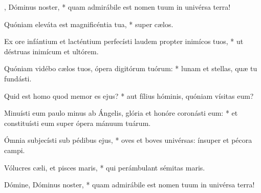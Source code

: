 \begin{psalmus}

    , Dóminus noster, * quam admirábile est nomen tuum in univérsa terra!

    Quóniam eleváta est magnificéntia tua, * super cælos.

    Ex ore infántium et lacténtium perfecísti laudem propter inimícos tuos, * ut déstruas inimícum et ultórem.

    Quóniam vidébo cælos tuos, ópera digitórum tuórum: * lunam et stellas, quæ tu fundásti.

    Quid est homo quod memor es ejus? * aut fílius hóminis, quóniam vísitas eum?

    Minuísti eum paulo minus ab Ángelis, glória et honóre coronásti eum: * et constituísti eum super ópera mánuum tuárum.

    Ómnia subjecísti sub pédibus ejus, * oves et boves univérsas: ínsuper et pécora campi.

    Vólucres cæli, et pisces maris, * qui perámbulant sémitas maris.

    Dómine, Dóminus noster, * quam admirábile est nomen tuum in univérsa terra!

\end{psalmus}
